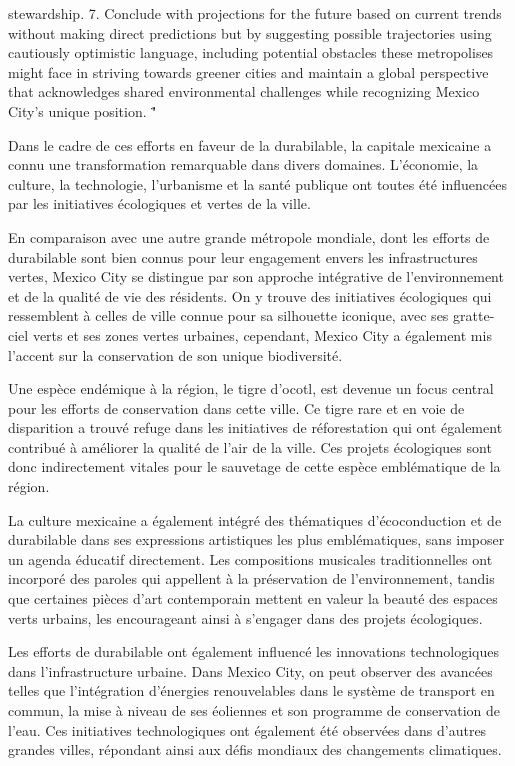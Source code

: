 \documentclass[12pt, a4paper]{article}
\begin{document}
stewardship. 7. Conclude with projections for the future based on current trends without making direct predictions but by suggesting possible trajectories using cautiously optimistic language, including potential obstacles these metropolises might face in striving towards greener cities and maintain a global perspective that acknowledges shared environmental challenges while recognizing Mexico City's unique position. \""

Dans le cadre de ces efforts en faveur de la durabilable, la capitale mexicaine a connu une transformation remarquable dans divers domaines. L'économie, la culture, la technologie, l'urbanisme et la santé publique ont toutes été influencées par les initiatives écologiques et vertes de la ville.

En comparaison avec une autre grande métropole mondiale, dont les efforts de durabilable sont bien connus pour leur engagement envers les infrastructures vertes, Mexico City se distingue par son approche intégrative de l'environnement et de la qualité de vie des résidents. On y trouve des initiatives écologiques qui ressemblent à celles de ville connue pour sa silhouette iconique, avec ses gratte-ciel verts et ses zones vertes urbaines, cependant, Mexico City a également mis l'accent sur la conservation de son unique biodiversité.

Une espèce endémique à la région, le tigre d'ocotl, est devenue un focus central pour les efforts de conservation dans cette ville. Ce tigre rare et en voie de disparition a trouvé refuge dans les initiatives de réforestation qui ont également contribué à améliorer la qualité de l'air de la ville. Ces projets écologiques sont donc indirectement vitales pour le sauvetage de cette espèce emblématique de la région.

La culture mexicaine a également intégré des thématiques d'écoconduction et de durabilable dans ses expressions artistiques les plus emblématiques, sans imposer un agenda éducatif directement. Les compositions musicales traditionnelles ont incorporé des paroles qui appellent à la préservation de l'environnement, tandis que certaines pièces d'art contemporain mettent en valeur la beauté des espaces verts urbains, les encourageant ainsi à s'engager dans des projets écologiques.

Les efforts de durabilable ont également influencé les innovations technologiques dans l'infrastructure urbaine. Dans Mexico City, on peut observer des avancées telles que l'intégration d'énergies renouvelables dans le système de transport en commun, la mise à niveau de ses éoliennes et son programme de conservation de l'eau. Ces initiatives technologiques ont également été observées dans d'autres grandes villes, répondant ainsi aux défis mondiaux des changements climatiques.
\end{document}
